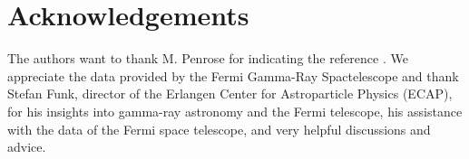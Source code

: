 \documentclass[12pt]{article}
\begin{document}
\section*{Acknowledgements}
The authors want to thank M. Penrose for indicating the reference \cite{20}. We appreciate the data provided by the Fermi Gamma-Ray Spactelescope and thank Stefan Funk, director of the Erlangen Center for Astroparticle Physics (ECAP), for his insights into gamma-ray astronomy and the Fermi telescope, his assistance with the data of the Fermi space telescope, and very helpful discussions and advice.




\end{document}
